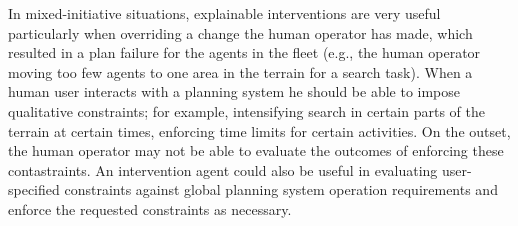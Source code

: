 In mixed-initiative situations, explainable interventions are very useful particularly when overriding a change the human operator has made, which resulted in a plan failure for the agents in the fleet (e.g., the human operator moving too few agents to one area in the terrain for a search task). When a human user interacts with a planning system he should be able to impose qualitative constraints; for example, intensifying search in certain parts of the terrain at certain times, enforcing time limits for certain activities. On the outset, the human operator may not be able to evaluate the outcomes of enforcing these contastraints. An intervention agent could also be useful in evaluating user-specified constraints against global planning system operation requirements and enforce the requested constraints as necessary.












